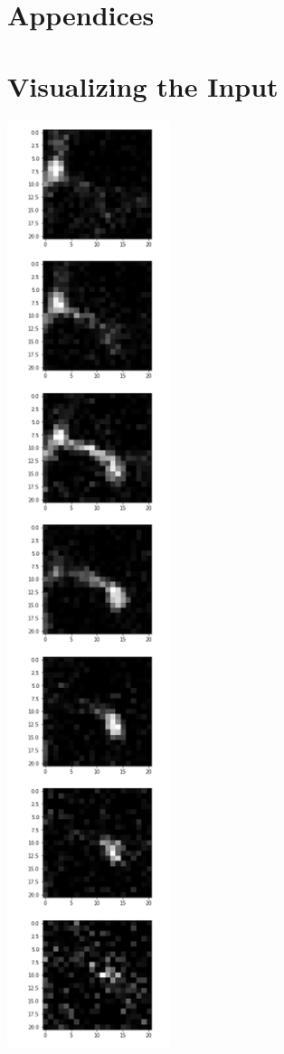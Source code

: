 \documentclass{neu_handout}
\begin{document}
\newpage

\appendix
\section*{Appendices}

\section{Visualizing the Input}
\includegraphics[width=0.2\linewidth]{neuron-slices}
\end{document}
